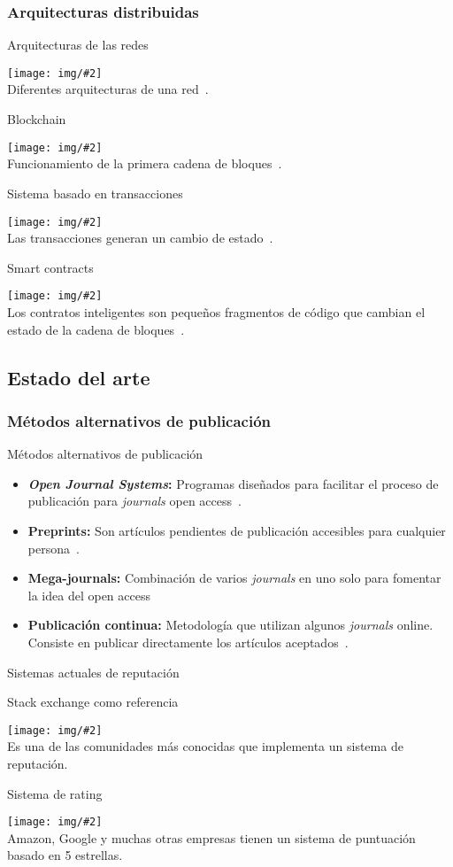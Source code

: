 \documentclass{beamer}
\newcommand{\ib}[1]{\item \textbf{#1} }
\newcommand{\framei}[4]{
  \begin{frame}{#1}
    \begin{center}
      \texttt{[image: img/\#2]}\\
      #3~\cite{#4}.
    \end{center}
  \end{frame}
}
\newcommand{\framein}[3]{
  \begin{frame}{#1}
    \begin{center}
      \texttt{[image: img/\#2]}\\
      #3.
    \end{center}
  \end{frame}
}
\newcommand{\framet}[3]{
  \begin{frame}{#1}
    #2
  \end{frame}
}
\begin{document}
\subsubsection{Arquitecturas distribuidas}
\framei{Arquitecturas de las redes}{architectures.png}{Diferentes arquitecturas de una red}{baran1964distributed}

\framei{Blockchain}{blockchain.png}{Funcionamiento de la primera cadena de bloques}{nakamoto2008bitcoin}

\framei{Sistema basado en transacciones}{transaction.png}{Las transacciones generan un cambio de estado}{antonopoulos2014mastering}

\framei{Smart contracts}{sc.png}{Los contratos inteligentes son
  pequeños fragmentos de código que cambian el estado de la cadena de bloques}{buterin2014ethereum}

\subsection{Estado del arte}
\subsubsection{Métodos alternativos de publicación}
\framet{Métodos alternativos de publicación}{
  \begin{itemize}
    \ib{\emph{Open Journal Systems}:} Programas diseñados para facilitar el
    proceso de publicación para \textit{journals} open access~\cite{willinsky2005open}.
    \ib{Preprints:} Son artículos pendientes de publicación accesibles
    para cualquier persona~\cite{shuai2012scientific}.
    \ib{Mega-journals:} Combinación de varios \emph{journals} en uno solo para
    fomentar la idea del open access~\cite{binfield2013open}
    \ib{Publicación continua:} Metodología que utilizan algunos
      \emph{journals} online. Consiste en publicar directamente los artículos
      aceptados~\cite{anderton2013continuous}.
  \end{itemize}
}

\subsubsection{Sistemas actuales de reputación}
\framein{Stack exchange como referencia}{se.png}{Es una de las comunidades más
  conocidas que implementa un sistema de reputación}

\framein{Sistema de rating}{amazon.jpg}{Amazon, Google y muchas otras empresas  tienen un sistema de
  puntuación basado en 5 estrellas}
\end{document}

